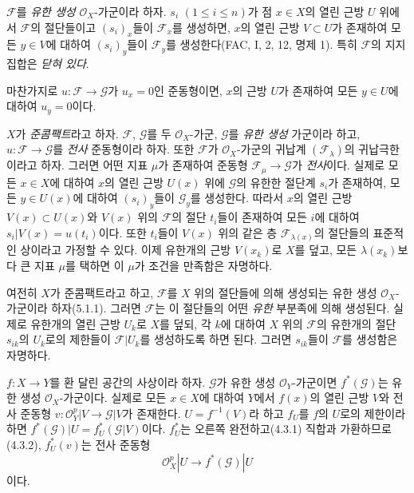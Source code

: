 \begin{env}[5.2.2]
\label{0.5.2.2-ko}
$\mathcal F$를 \emph{유한 생성} $\mathcal O_X$-가군이라 하자.
$s_i$ $(1\leq i\leq n)$가 점 $x\in X$의 열린 근방 $U$ 위에서
$\mathcal F$의 절단들이고 $(s_i)_x$들이 $\mathcal F_x$를 생성하면,
$x$의 열린 근방 $V\subset U$가 존재하여 모든 $y\in V$에 대하여
$(s_i)_y$들이 $\mathcal F_y$를 생성한다(FAC, I, 2, 12, 명제 1).
특히 $\mathcal F$의 지지집합은 \emph{닫혀 있다}.


마찬가지로 $u:\mathcal F\to\mathcal G$가 $u_x=0$인 준동형이면,
$x$의 근방 $U$가 존재하여 모든 $y\in U$에 대하여 $u_y=0$이다.
\end{env}

\begin{env}[5.2.3]
\label{0.5.2.3-ko}
$X$가 \emph{준콤팩트}라고 하자. $\mathcal F$, $\mathcal G$를 두
$\mathcal O_X$-가군, $\mathcal G$를 \emph{유한 생성} 가군이라 하고,
$u:\mathcal F\to\mathcal G$를 \emph{전사} 준동형이라 하자. 또한
$\mathcal F$가 $\mathcal O_X$-가군의 귀납계
$(\mathcal F_\lambda)$의 귀납극한이라고 하자. 그러면 어떤 지표
$\mu$가 존재하여 준동형 $\mathcal F_\mu\to\mathcal G$가
\emph{전사}이다. 실제로 모든 $x\in X$에 대하여 $x$의 열린 근방
$U(x)$ 위에 $\mathcal G$의 유한한 절단계 $s_i$가 존재하여, 모든
$y\in U(x)$에 대하여 $(s_i)_y$들이 $\mathcal G_y$를 생성한다.
따라서 $x$의 열린 근방 $V(x)\subset U(x)$와 $V(x)$ 위의
$\mathcal F$의 절단 $t_i$들이 존재하여 모든 $i$에 대하여
$s_i|V(x)=u(t_i)$이다. 또한 $t_i$들이 $V(x)$ 위의 같은 층
$\mathcal F_{\lambda(x)}$의 절단들의 표준적인 상이라고 가정할 수
있다. 이제 유한개의 근방 $V(x_k)$로 $X$를 덮고, 모든
$\lambda(x_k)$보다 큰 지표 $\mu$를 택하면 이 $\mu$가 조건을
만족함은 자명하다.

여전히 $X$가 준콤팩트라고 하고, $\mathcal F$를 $X$ 위의 절단들에
의해 생성되는 유한 생성 $\mathcal O_X$-가군이라 하자(5.1.1).
그러면 $\mathcal F$는 이 절단들의 어떤 \emph{유한} 부분족에 의해
생성된다. 실제로 유한개의 열린 근방 $U_k$로 $X$를 덮되, 각 $k$에
대하여 $X$ 위의 $\mathcal F$의 유한개의 절단 $s_{ik}$의 $U_k$로의
제한들이 $\mathcal F|U_k$를 생성하도록 하면 된다. 그러면
$s_{ik}$들이 $\mathcal F$를 생성함은 자명하다.
\end{env}

\begin{env}[5.2.4]
\label{0.5.2.4-ko}
$f:X\to Y$를 환 달린 공간의 사상이라 하자. $\mathcal G$가 유한 생성
$\mathcal O_Y$-가군이면 $f^*(\mathcal G)$는 유한 생성
$\mathcal O_X$-가군이다. 실제로 모든 $x\in X$에 대하여 $Y$에서
$f(x)$의 열린 근방 $V$와 전사 준동형
$v:\mathcal O_Y^p|V\to\mathcal G|V$가 존재한다. $U=f^{-1}(V)$라 하고
$f_U$를 $f$의 $U$로의 제한이라 하면
$f^*(\mathcal G)|U=f_U^*(\mathcal G|V)$이다. $f_U^*$는 오른쪽
완전하고(4.3.1) 직합과 가환하므로(4.3.2), $f_U^*(v)$는 전사 준동형
\[
  \mathcal O_X^p|U\longrightarrow f^*(\mathcal G)|U
\]
이다.
\end{env}

